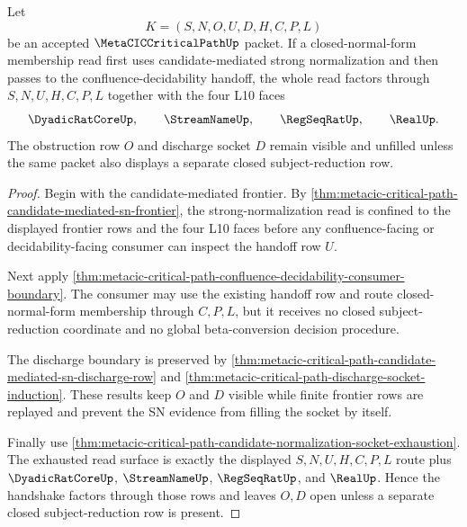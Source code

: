 \begin{theorem}
\label{thm:metacic-critical-path-sn-confluence-decidability-handshake}
Let
$$
K=(S,N,O,U,D,H,C,P,L)
$$
be an accepted $\MetaCICCriticalPathUp$ packet. If a closed-normal-form membership read first uses candidate-mediated strong normalization and then passes to the confluence-decidability handoff, the whole read factors through $S,N,U,H,C,P,L$ together with the four L10 faces
$$
\DyadicRatCoreUp,\qquad
\StreamNameUp,\qquad
\RegSeqRatUp,\qquad
\RealUp .
$$
The obstruction row $O$ and discharge socket $D$ remain visible and unfilled unless the same packet also displays a separate closed subject-reduction row.
\end{theorem}
\begin{proof}
Begin with the candidate-mediated frontier. By \autoref{thm:metacic-critical-path-candidate-mediated-sn-frontier}, the strong-normalization read is confined to the displayed frontier rows and the four L10 faces before any confluence-facing or decidability-facing consumer can inspect the handoff row $U$.

Next apply \autoref{thm:metacic-critical-path-confluence-decidability-consumer-boundary}. The consumer may use the existing handoff row and route closed-normal-form membership through $C,P,L$, but it receives no closed subject-reduction coordinate and no global beta-conversion decision procedure.

The discharge boundary is preserved by \autoref{thm:metacic-critical-path-candidate-mediated-sn-discharge-row} and \autoref{thm:metacic-critical-path-discharge-socket-induction}. These results keep $O$ and $D$ visible while finite frontier rows are replayed and prevent the SN evidence from filling the socket by itself.

Finally use \autoref{thm:metacic-critical-path-candidate-normalization-socket-exhaustion}. The exhausted read surface is exactly the displayed $S,N,U,H,C,P,L$ route plus $\DyadicRatCoreUp$, $\StreamNameUp$, $\RegSeqRatUp$, and $\RealUp$. Hence the handshake factors through those rows and leaves $O,D$ open unless a separate closed subject-reduction row is present.
\end{proof}

